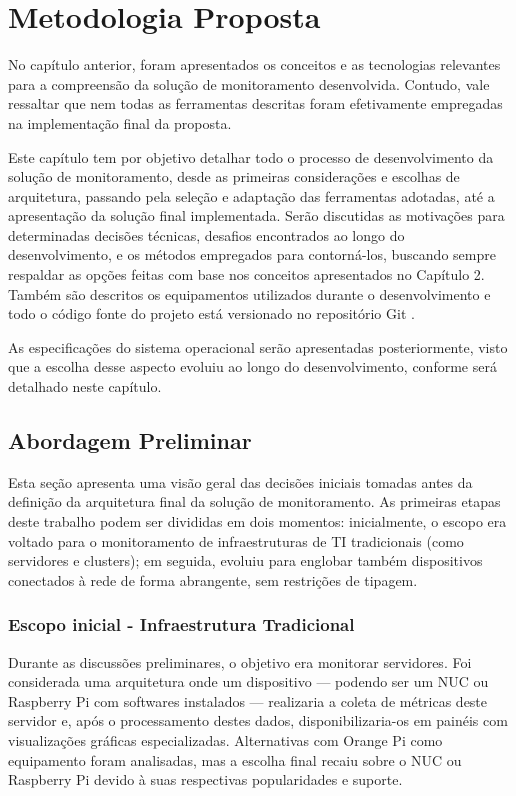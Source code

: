 \chapter{Metodologia Proposta}
\label{chap3}

No capítulo anterior, foram apresentados os conceitos e as tecnologias relevantes para a compreensão da solução de monitoramento desenvolvida. Contudo, vale ressaltar que nem todas as ferramentas descritas foram efetivamente empregadas na implementação final da proposta.

Este capítulo tem por objetivo detalhar todo o processo de desenvolvimento da solução de monitoramento, desde as primeiras considerações e escolhas de arquitetura, passando pela seleção e adaptação das ferramentas adotadas, até a apresentação da solução final implementada. Serão discutidas as motivações para determinadas decisões técnicas, desafios encontrados ao longo do desenvolvimento, e os métodos empregados para contorná-los, buscando sempre respaldar as opções feitas com base nos conceitos apresentados no Capítulo 2. Também são descritos os equipamentos utilizados durante o desenvolvimento e todo o código fonte do projeto está versionado no repositório Git \citep{vitorcossetti2025}.

As especificações do sistema operacional serão apresentadas posteriormente, visto que a escolha desse aspecto evoluiu ao longo do desenvolvimento, conforme será detalhado neste capítulo.

\section{Abordagem Preliminar}
\label{section:AbordagemPreliminar}

Esta seção apresenta uma visão geral das decisões iniciais tomadas antes da definição da arquitetura final da solução de monitoramento. As primeiras etapas deste trabalho podem ser divididas em dois momentos: inicialmente, o escopo era voltado para o monitoramento de infraestruturas de TI tradicionais (como servidores e clusters); em seguida, evoluiu para englobar também dispositivos conectados à rede de forma abrangente, sem restrições de tipagem.

\subsection{Escopo inicial - Infraestrutura Tradicional}
\label{subsection:EscopoInicial}

Durante as discussões preliminares, o objetivo era monitorar servidores. Foi considerada uma arquitetura onde um dispositivo --- podendo ser um NUC ou Raspberry Pi com softwares instalados --- realizaria a coleta de métricas deste servidor e, após o processamento destes dados, disponibilizaria-os em painéis com visualizações gráficas especializadas. Alternativas com Orange Pi como equipamento foram analisadas, mas a escolha final recaiu sobre o NUC ou Raspberry Pi devido à suas respectivas popularidades e suporte.

